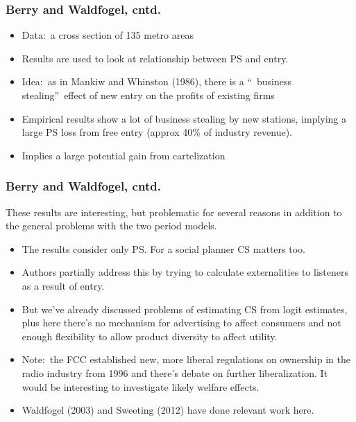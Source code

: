 \begin{frame}%

\frametitle{Berry and Waldfogel, cntd.}

\begin{itemize}
\item Data:\ a cross section of 135 metro areas

\item Results are used to look at relationship between PS and entry.

\item Idea:\ as in Mankiw and Whinston (1986), there is a \textquotedblleft\
business stealing\textquotedblright\ effect of new entry on the profits of
existing firms

\item Empirical results show a lot of business stealing by new stations,
implying a large PS loss from free entry (approx 40\% of industry revenue).

\item Implies a large potential gain from cartelization
\end{itemize}

\end{frame}%

\begin{frame}%

\frametitle{Berry and Waldfogel, cntd.}

These results are interesting, but problematic for several reasons in
addition to the general problems with the two period models.

\begin{itemize}
\item The results consider only PS. For a social planner CS matters too.

\item Authors partially address this by trying to calculate externalities to
listeners as a result of entry.

\item But we've already discussed problems of estimating CS from logit
estimates, plus here there's no mechanism for advertising to affect
consumers and not enough flexibility to allow product diversity to affect
utility.

\item Note:\ the FCC established new, more liberal regulations on ownership
in the radio industry from 1996 and there's debate on further
liberalization. It would be interesting to investigate likely welfare
effects.

\item Waldfogel (2003) and Sweeting (2012) have done relevant work here.
\end{itemize}

\end{frame}%

